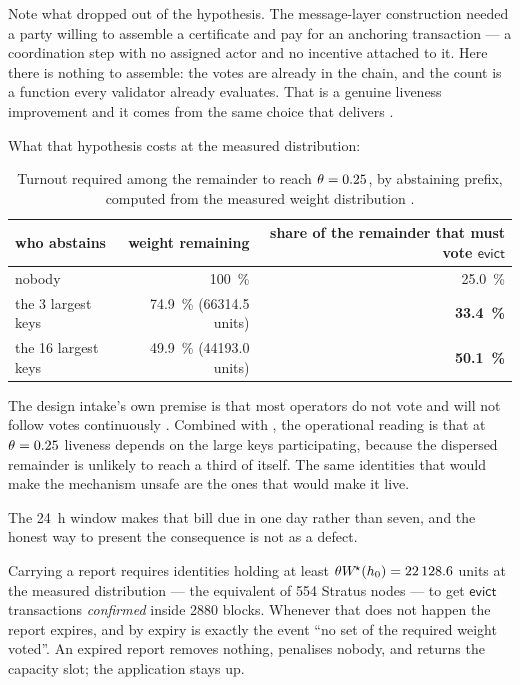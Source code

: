 Note what dropped out of the hypothesis. The message-layer construction needed a party willing to
assemble a certificate and pay for an anchoring transaction --- a coordination step with no assigned
actor and no incentive attached to it. Here there is nothing to assemble: the votes are already in
the chain, and the count is a function every validator already evaluates. That is a genuine
liveness improvement and it comes from the same choice that delivers
.

What that hypothesis costs at the measured distribution:

\begin{table}[H]
\centering
\small
\begin{tabular}{@{}lrr@{}}
\toprule
who abstains & weight remaining & share of the remainder that must vote $\mathsf{evict}$ \\
\midrule
nobody & \SI{100}{\percent} & \SI{25.0}{\percent} \\
the 3 largest keys & \SI{74.9}{\percent} (\num{66314.5} units) & \textbf{\SI{33.4}{\percent}} \\
the 16 largest keys & \SI{49.9}{\percent} (\num{44193.0} units) & \textbf{\SI{50.1}{\percent}} \\
\bottomrule
\end{tabular}
\caption{Turnout required among the remainder to reach $\theta = 0.25$, by abstaining prefix,
computed from the measured weight distribution
.}
\end{table}

The design intake's own premise is that most operators do not vote and will not follow votes
continuously . Combined with
, the operational reading is that at $\theta = 0.25$ liveness depends on the
large keys participating, because the dispersed remainder is unlikely to reach a third of itself.
The same identities that would make the mechanism unsafe are the ones that would make it live.

The \SI{24}{\hour} window makes that bill due in one day rather than seven, and the honest way to
present the consequence is not as a defect.

\begin{proposition}
\label{prop:23:expiry}
Carrying a report requires identities holding at least
$\theta W^{\!\star}(h_0) = \num{22128.6}$ units at the measured distribution --- the
equivalent of \num{554} Stratus nodes --- to get $\mathsf{evict}$ transactions \emph{confirmed}
inside \num{2880} blocks. Whenever that does not happen the report expires, and by
 expiry is exactly the event ``no set of the required weight voted''. An
expired report removes nothing, penalises nobody, and returns the capacity slot; the application
stays up.
\end{proposition}

